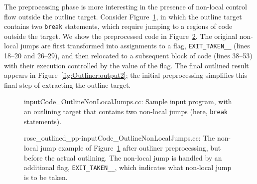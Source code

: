 The preprocessing phase is more interesting in the presence of
non-local control flow outside the outline target. Consider
Figure~\ref{fig:Outliner:input2}, in which the outline target
contains two \texttt{break} statements, which require jumping to a
regions of code outside the target. We show the preprocessed code in
Figure~\ref{fig:Outliner:preproc2}. The original non-local jumps
are first transformed into assignments to a flag,
\texttt{EXIT\_TAKEN\_\_} (lines 18--20 and 26--29), and then relocated
to a subsequent block of code (lines 38--53) with their execution
controlled by the value of the flag. The final outlined result appears
in Figure~\ref{fig:Outliner:output2}; the initial preprocessing
simplifies this final step of extracting the outline target.

\begin{figure}[!h]
{\indent
{\mySmallFontSize
\begin{latexonly}
   
\end{latexonly}
\begin{htmlonly}
   
\end{htmlonly}

}
}
\caption{inputCode\_OutlineNonLocalJumps.cc: Sample input program,
with an outlining target that contains two non-local jumps (here,
\texttt{break} statements).}
\label{fig:Outliner:input2}
\end{figure}

\begin{figure}[!h]
{\indent
{\mySmallFontSize
\begin{latexonly}
   
\end{latexonly}
\begin{htmlonly}
   
\end{htmlonly}

}
}
\caption{rose\_outlined\_pp-inputCode\_OutlineNonLocalJumps.cc: The
non-local jump example of Figure~\ref{fig:Outliner:input2} after
outliner preprocessing, but before the actual outlining.  The
non-local jump is handled by an additional flag,
\texttt{EXIT\_TAKEN\_\_}, which indicates what non-local jump is to be
taken.}
\label{fig:Outliner:preproc2}
\end{figure}

